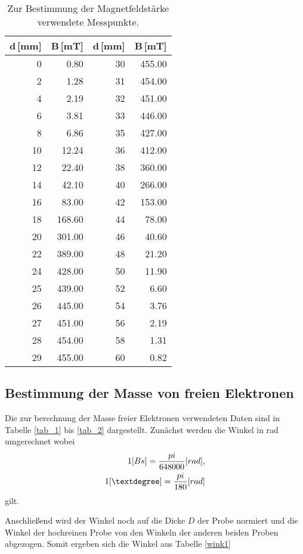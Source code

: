 \begin{table}
	\centering
	\caption[]{Zur Bestimmung der Magnetfeldstärke verwendete Messpunkte.}
	\begin{tabular}{r r r r}
		d\,[mm] & B\,[mT] & d\,[mm] & B\,[mT]\\
		\hline\hline
		 0	&	  0.80	&	30	&	455.00\\
		 2	&	  1.28	&	31	&	454.00\\
		 4	&	  2.19	&	32	&	451.00\\
		 6	&	  3.81	&	33	&	446.00\\
		 8	&	  6.86	&	35	&	427.00\\
		10	&	 12.24	&	36	&	412.00\\
		12	&	 22.40	&	38	&	360.00\\
		14	&	 42.10	&	40	&	266.00\\
		16	&	 83.00	&	42	&	153.00\\
		18	&	168.60	&	44	&	 78.00\\
		20	&	301.00	&	46	&	 40.60\\
		22	&	389.00	&	48	&	 21.20\\
		24	&	428.00	&	50	&	 11.90\\
		25	&	439.00	&	52	&	  6.60\\
		26	&	445.00	&	54	&	  3.76\\
		27	&	451.00	&	56	&	  2.19\\
		28	&	454.00	&	58	&	  1.31\\
		29	&	455.00	&	60	&	  0.82\\
		\hline
	\end{tabular}
	\label{tab_mag}
\end{table}
\FloatBarrier
\subsection{Bestimmung der Masse von freien Elektronen} %
\label{sub:bestimmung_der_masse_von_freien_elektronen}

Die zur berechnung der Masse freier Elektronen verwendeten Daten sind in Tabelle \ref{tab_1} bis \ref{tab_2} dargestellt.
Zunächst werden die Winkel in rad umgerechnet wobei
\begin{eqnarray}
	1 \text[Bs] = \frac{pi}{648000} \text[rad],\\
	1 \text[°] = \frac{pi}{180} \text[rad]
\end{eqnarray}
gilt.

Anschließend wird der Winkel noch auf die Dicke $D$ der Probe normiert und die Winkel der hochreinen Probe von den Winkeln der anderen beiden Proben abgezogen.
Somit ergeben sich die Winkel aus Tabelle \ref{wink1}

